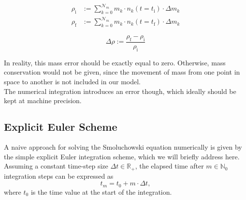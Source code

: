          \\ %


        \begin{align}
            \rho_\text{i}
                &:=\sum_{k=0}^{\mathcal N_m} m_k\cdot n_k(t=t_\text{i})\cdot\Delta m_k
            \\
            \rho_\text{f}
                &:=\sum_{k=0}^{\mathcal N_m} m_k\cdot n_k(t=t_\text{f})\cdot\Delta m_k
        \end{align}

        
        \begin{equation}
            \Delta\rho
                :=\frac{\rho_\text{f}-\rho_\text{i}}{\rho_\text{i}}
        \end{equation}

        In reality, this mass error should be exactly equal to zero. Otherwise, mass conservation would not be given, since the movement of mass from one point in space to another is not included in our model. \\
        
        The numerical integration introduces an error though, which ideally should be kept at machine precision. %

    \subsection{Explicit Euler Scheme}

        A naive approach for solving the Smoluchowski equation numerically is given by the simple 
        explicit Euler integration scheme, which we will briefly address here. Assuming a constant 
        time-step size $\Delta t\in\mathbb R_+$, the elapsed time after $m\in\mathbb N_0$ integration 
        steps can be expressed as 
        \begin{equation}
            t_m
                =t_0+m\cdot\Delta t,
        \end{equation}
        where $t_0$ is the time value at the start of the integration.\\
        
